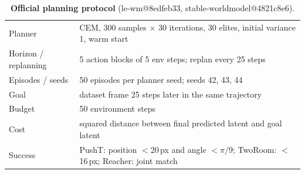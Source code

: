 \begin{table}[h]
\centering\scriptsize
\caption{\textbf{Official planning protocol} (le-wm@8edfeb33, stable-worldmodel@4821c8e6).}
\label{tab:plan-protocol}
\begin{tabular}{@{}ll@{}}
\toprule
Planner & CEM, 300 samples $\times$ 30 iterations, 30 elites, initial variance 1, warm start \\
Horizon / replanning & 5 action blocks of 5 env steps; replan every 25 steps \\
Episodes / seeds & 50 episodes per planner seed; seeds 42, 43, 44 \\
Goal & dataset frame 25 steps later in the same trajectory \\
Budget & 50 environment steps \\
Cost & squared distance between final predicted latent and goal latent \\
Success & PushT: position $<$20\,px and angle $<\pi/9$; TwoRoom: $<$16\,px; Reacher: joint match \\
\bottomrule
\end{tabular}
\end{table}
